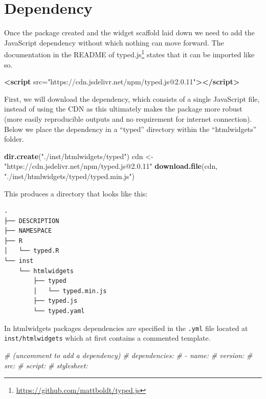 \documentclass[
]{krantz}
\makeatletter
\newenvironment{Shaded}{\begin{snugshade}}{\end{snugshade}}
\newcommand{\CommentTok}[1]{\textcolor[rgb]{0.37,0.37,0.37}{\textit{#1}}}
\newcommand{\KeywordTok}[1]{\textcolor[rgb]{0.27,0.27,0.27}{\textbf{#1}}}
\newcommand{\NormalTok}[1]{#1}
\newcommand{\OtherTok}[1]{\textcolor[rgb]{0.37,0.37,0.37}{#1}}
\newcommand{\StringTok}[1]{\textcolor[rgb]{0.5,0.5,0.5}{#1}}
\renewcommand{\href}[2]{#2\footnote{\url{#1}}}
\newenvironment{kframe}{%
\medskip{}
\setlength{\fboxsep}{.8em}
 \def\at@end@of@kframe{}%
 \ifinner\ifhmode%
  \def\at@end@of@kframe{\end{minipage}}%
  \begin{minipage}{\columnwidth}%
 \fi\fi%
 \def\FrameCommand##1{\hskip\@totalleftmargin \hskip-\fboxsep
 \colorbox{shadecolor}{##1}\hskip-\fboxsep
     \hskip-\linewidth \hskip-\@totalleftmargin \hskip\columnwidth}%
 \MakeFramed {\advance\hsize-\width
   \@totalleftmargin\z@ \linewidth\hsize
   \@setminipage}}%
 {\par\unskip\endMakeFramed%
 \at@end@of@kframe}
\renewenvironment{Shaded}{\begin{kframe}}{\end{kframe}}
\makeatother
\begin{document}
\hypertarget{dependency}{%
\section*{Dependency}\label{dependency}}


Once the package created and the widget scaffold laid down we need to add the JavaScript dependency without which nothing can move forward. The \href{https://github.com/mattboldt/typed.js}{documentation in the README of typed.js} states that it can be imported like so.

\begin{Shaded}
\begin{Highlighting}[]
\KeywordTok{<script}\OtherTok{ src=}\StringTok{"https://cdn.jsdelivr.net/npm/typed.js@2.0.11"}\KeywordTok{></script>}
\end{Highlighting}
\end{Shaded}

First, we will download the dependency, which consists of a single JavaScript file, instead of using the CDN as this ultimately makes the package more robust (more easily reproducible outputs and no requirement for internet connection). Below we place the dependency in a ``typed'' directory within the ``htmlwidgets'' folder.

\begin{Shaded}
\begin{Highlighting}[]
\KeywordTok{dir.create}\NormalTok{(}\StringTok{"./inst/htmlwidgets/typed"}\NormalTok{)}
\NormalTok{cdn <{-}}\StringTok{ "https://cdn.jsdelivr.net/npm/typed.js@2.0.11"}
\KeywordTok{download.file}\NormalTok{(cdn, }\StringTok{"./inst/htmlwidgets/typed/typed.min.js"}\NormalTok{)}
\end{Highlighting}
\end{Shaded}

This produces a directory that looks like this:

\begin{verbatim}
.
├── DESCRIPTION
├── NAMESPACE
├── R
│   └── typed.R
└── inst
    └── htmlwidgets
        ├── typed
        │   └── typed.min.js
        ├── typed.js
        └── typed.yaml
\end{verbatim}

In htmlwidgets packages dependencies are specified in the \texttt{.yml} file located at \texttt{inst/htmlwidgets} which at first contains a commented template.

\begin{Shaded}
\begin{Highlighting}[]
\CommentTok{\# (uncomment to add a dependency)}
\CommentTok{\# dependencies:}
\CommentTok{\#  {-} name:}
\CommentTok{\#    version:}
\CommentTok{\#    src:}
\CommentTok{\#    script:}
\CommentTok{\#    stylesheet:}
\end{Highlighting}
\end{Shaded}
\end{document}
